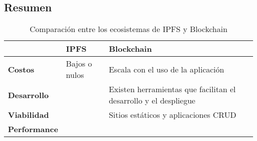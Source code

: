 \subsection{Resumen}

\setlength\tabcolsep{1pt}
\begin{table}[H]
    \centering
    \begin{tabular}{|m{7em}|m{14em}|m{14em}|}
    \hline
     & \textbf{IPFS} & \textbf{Blockchain} \\
    \hline
    \textbf{Costos} & Bajos o nulos & Escala con el uso de la aplicación \\
    \hline
    \textbf{Desarrollo} &  & Existen herramientas que facilitan el desarrollo y el despliegue \\
    \hline
    \textbf{Viabilidad} & & Sitios estáticos y aplicaciones CRUD \\
    \hline
    \textbf{Performance} & & \\
    \hline
    \end{tabular}
    \caption{Comparación entre los ecosistemas de IPFS y Blockchain}
\end{table}